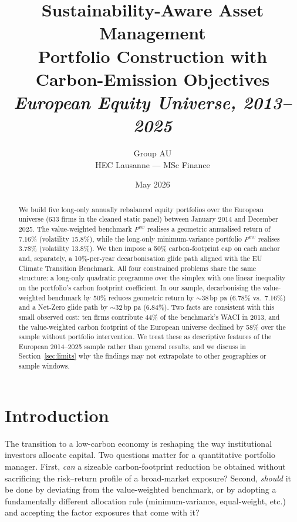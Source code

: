 \documentclass[11pt,a4paper]{article}
\title{\textbf{Sustainability-Aware Asset Management}\\[2pt]
\large Portfolio Construction with Carbon-Emission Objectives\\[2pt]
\large \textit{European Equity Universe, 2013--2025}}
\author{Group AU \\ \small HEC Lausanne --- MSc Finance}
\date{May 2026}
\begin{document}
\maketitle
\thispagestyle{empty}

\begin{abstract}
\noindent
We build five long-only annually rebalanced equity portfolios over the
European universe (633 firms in the cleaned static panel) between
January 2014 and December 2025. The value-weighted benchmark $P^{vw}$
realises a geometric annualised return of 7.16\% (volatility 15.8\%),
while the long-only minimum-variance portfolio $P^{mv}$ realises 3.78\%
(volatility 13.8\%). We then impose a 50\% carbon-footprint cap on
each anchor and, separately, a 10\%-per-year decarbonisation glide path
aligned with the EU Climate Transition Benchmark. All four constrained
problems share the same structure: a long-only quadratic programme over
the simplex with one linear inequality on the portfolio's carbon
footprint coefficient. In our sample, decarbonising the value-weighted
benchmark by 50\% reduces geometric return by $\sim$38\,bp pa (6.78\%
vs.\ 7.16\%) and a Net-Zero glide path by $\sim$32\,bp pa (6.84\%).
Two facts are consistent with this small observed cost: ten firms
contribute 44\% of the benchmark's WACI in 2013, and the
value-weighted carbon footprint of the European universe declined by
58\% over the sample without portfolio intervention. We treat these
as descriptive features of the European 2014--2025 sample rather than
general results, and we discuss in Section~\ref{sec:limits} why the
findings may not extrapolate to other geographies or sample windows.
\end{abstract}

\tableofcontents
\bigskip

\section{Introduction}

The transition to a low-carbon economy is reshaping the way institutional
investors allocate capital. Two questions matter for a quantitative
portfolio manager. First, \textit{can} a sizeable carbon-footprint
reduction be obtained without sacrificing the risk--return profile of a
broad-market exposure? Second, \textit{should} it be done by deviating from
the value-weighted benchmark, or by adopting a fundamentally different
allocation rule (minimum-variance, equal-weight, etc.) and accepting the
factor exposures that come with it?
\end{document}
